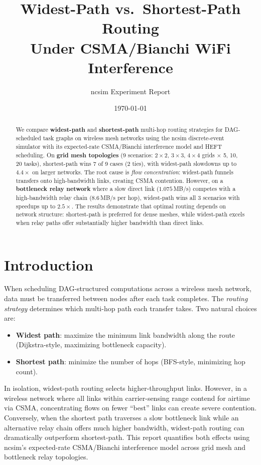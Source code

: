 \documentclass[11pt]{article}
\title{Widest-Path vs.\ Shortest-Path Routing\\Under CSMA/Bianchi WiFi Interference}
\author{ncsim Experiment Report}
\date{\today}
\begin{document}
\maketitle

\begin{abstract}
We compare \textbf{widest-path} and \textbf{shortest-path} multi-hop routing
strategies for DAG-scheduled task graphs on wireless mesh networks using the
ncsim discrete-event simulator with its expected-rate CSMA/Bianchi interference
model and HEFT scheduling. On \textbf{grid mesh topologies} (9 scenarios:
$2\times2$, $3\times3$, $4\times4$ grids $\times$ 5, 10, 20 tasks),
shortest-path wins 7 of 9 cases (2 ties), with widest-path slowdowns up to
$4.4\times$ on larger networks. The root cause is \emph{flow concentration}:
widest-path funnels transfers onto high-bandwidth links, creating CSMA
contention. However, on a \textbf{bottleneck relay network} where a slow direct
link ($1.075$\,MB/s) competes with a high-bandwidth relay chain
($8.6$\,MB/s per hop), widest-path wins all 3 scenarios with speedups up to
$2.5\times$. The results demonstrate that optimal routing depends on network
structure: shortest-path is preferred for dense meshes, while widest-path
excels when relay paths offer substantially higher bandwidth than direct links.
\end{abstract}

\section{Introduction}

When scheduling DAG-structured computations across a wireless mesh network,
data must be transferred between nodes after each task completes. The
\emph{routing strategy} determines which multi-hop path each transfer takes.
Two natural choices are:

\begin{itemize}
    \item \textbf{Widest path}: maximize the minimum link bandwidth along the
    route (Dijkstra-style, maximizing bottleneck capacity).
    \item \textbf{Shortest path}: minimize the number of hops (BFS-style,
    minimizing hop count).
\end{itemize}

In isolation, widest-path routing selects higher-throughput links. However, in
a wireless network where all links within carrier-sensing range contend for
airtime via CSMA, concentrating flows on fewer ``best'' links can create
severe contention. Conversely, when the shortest path traverses a slow
bottleneck link while an alternative relay chain offers much higher bandwidth,
widest-path routing can dramatically outperform shortest-path. This report
quantifies both effects using ncsim's expected-rate CSMA/Bianchi interference
model across grid mesh and bottleneck relay topologies.
\end{document}
